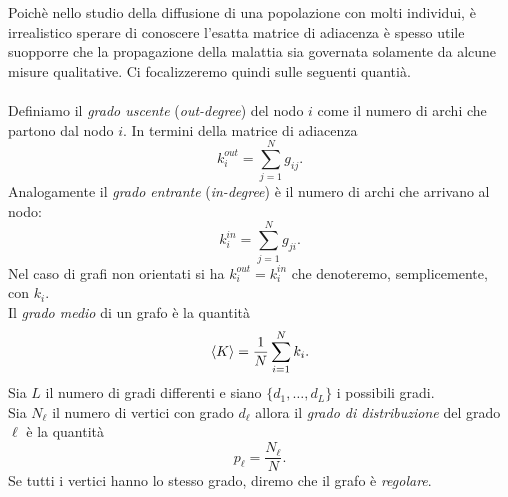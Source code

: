 \newpage
Poich\`e nello studio della diffusione di una popolazione con molti individui, \`e irrealistico sperare di conoscere l'esatta matrice di adiacenza \`e spesso utile suopporre che la propagazione della malattia sia governata solamente da alcune misure qualitative. Ci focalizzeremo quindi sulle seguenti quanti\`a.\\ \\
Definiamo il \textit{grado uscente} (\textit{out-degree})  del nodo $i$  come il numero di archi che partono dal nodo $i$. In termini della matrice di adiacenza
$$ k_i^{out} =\sum_{j=1}^N g_{ij}.$$
Analogamente il \textit{grado entrante} (\textit{in-degree}) \`e il numero di archi che arrivano al nodo:
$$ k_i^{in} = \sum_{j=1}^N g_{ji}.$$
Nel caso di grafi non orientati si ha $k_i^{out} = k_i^{in}$ che denoteremo, semplicemente, con $k_i$.\\
Il \textit{grado medio} di un grafo \`e la quantit\`a 
$$ \langle K \rangle = \frac{1}{N}\sum_{i=1}^N k_i.$$
Sia $L$ il numero di gradi differenti e siano $\{ d_1, \dots, d_L\}$ i possibili gradi.\\
Sia $N_\ell$ il numero di vertici con grado $d_\ell$ allora il \textit{grado di distribuzione} del grado $\ell$ \`e la quantit\`a
$$ p_\ell = \frac{N_\ell}{N}.$$
Se tutti i vertici hanno lo stesso grado, diremo che il grafo \`e \textit{regolare}.\\  \\
%
